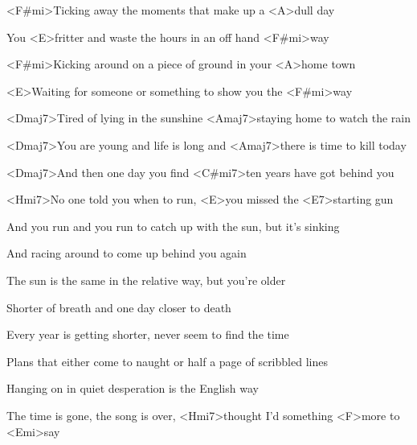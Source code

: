 

\zs
<F#mi>Ticking away the moments that make up a <A>dull day

You <E>fritter and waste the hours in an off hand <F#mi>way

<F#mi>Kicking around on a piece of ground in your <A>home town

<E>Waiting for someone or something to show you the <F#mi>way
\ks

\zs
<Dmaj7>Tired of lying in the sunshine <Amaj7>staying home to watch the rain

<Dmaj7>You are young and life is long and <Amaj7>there is time to kill today

<Dmaj7>And then one day you find <C#mi7>ten years have got behind you

<Hmi7>No one told you when to run, <E>you missed the <E7>starting gun
\ks

\zs
And you run and you run to catch up with the sun, but it's sinking

And racing around to come up behind you again

The sun is the same in the relative way, but you're older

Shorter of breath and one day closer to death
\ks

\zs
Every year is getting shorter, never seem to find the time

Plans that either come to naught or half a page of scribbled lines

Hanging on in quiet desperation is the English way

The time is gone, the song is over, <Hmi7>thought I'd something <F>more to <Emi>say
\ks

\kp
